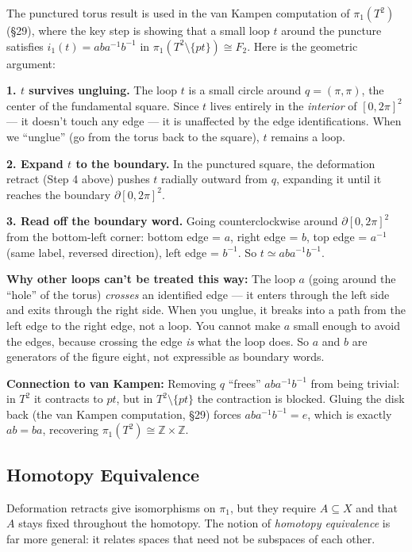 \documentclass[11pt]{report}
\begin{document}
\begin{rembox}
The punctured torus result is used in the van Kampen computation of $\pi_1(T^2)$ (\S 29), where the key step is showing that a small loop $t$ around the puncture satisfies $i_1(t) = aba^{-1}b^{-1}$ in $\pi_1(T^2 \setminus \{pt\}) \cong F_2$. Here is the geometric argument:

\textbf{1. $t$ survives ungluing.} The loop $t$ is a small circle around $q = (\pi, \pi)$, the center of the fundamental square. Since $t$ lives entirely in the \emph{interior} of $[0, 2\pi]^2$ --- it doesn't touch any edge --- it is unaffected by the edge identifications. When we ``unglue'' (go from the torus back to the square), $t$ remains a loop.

\textbf{2. Expand $t$ to the boundary.} In the punctured square, the deformation retract (Step 4 above) pushes $t$ radially outward from $q$, expanding it until it reaches the boundary $\partial[0, 2\pi]^2$.

\textbf{3. Read off the boundary word.} Going counterclockwise around $\partial[0, 2\pi]^2$ from the bottom-left corner: bottom edge = $a$, right edge = $b$, top edge = $a^{-1}$ (same label, reversed direction), left edge = $b^{-1}$. So $t \simeq aba^{-1}b^{-1}$.

\textbf{Why other loops can't be treated this way:} The loop $a$ (going around the ``hole'' of the torus) \emph{crosses} an identified edge --- it enters through the left side and exits through the right side. When you unglue, it breaks into a path from the left edge to the right edge, not a loop. You cannot make $a$ small enough to avoid the edges, because crossing the edge \emph{is} what the loop does. So $a$ and $b$ are generators of the figure eight, not expressible as boundary words.

\textbf{Connection to van Kampen:} Removing $q$ ``frees'' $aba^{-1}b^{-1}$ from being trivial: in $T^2$ it contracts to $pt$, but in $T^2 \setminus \{pt\}$ the contraction is blocked. Gluing the disk back (the van Kampen computation, \S 29) forces $aba^{-1}b^{-1} = e$, which is exactly $ab = ba$, recovering $\pi_1(T^2) \cong \mathbb{Z} \times \mathbb{Z}$.
\end{rembox}

\subsection{Homotopy Equivalence}

Deformation retracts give isomorphisms on $\pi_1$, but they require $A \subseteq X$ and that $A$ stays fixed throughout the homotopy. The notion of \emph{homotopy equivalence} is far more general: it relates spaces that need not be subspaces of each other.
\end{document}
